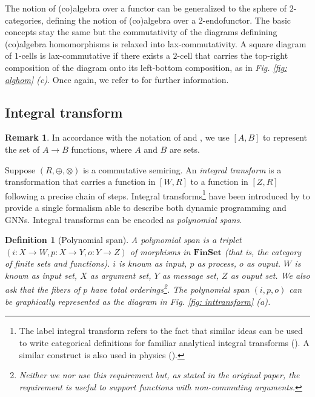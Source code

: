 \documentclass[11pt,a4paper,openright,twoside]{report}
\newcounter{mycounter}
\theoremstyle{plain}
\newtheorem{definition}[mycounter]{Definition}
\theoremstyle{definition}
\newtheorem{remark}[mycounter]{Remark}
\begin{document}
The notion of (co)algebra over a functor can be generalized to the sphere of $2$-categories, defining the notion of (co)algebra over a $2$-endofunctor. The basic concepts stay the same but the commutativity of the diagrams definining (co)algebra homomorphisms is relaxed into lax-commutativity. A square diagram of $1$-cells is lax-commutative if there exists a $2$-cell that carries the top-right composition of the diagram onto its left-bottom composition, as in \textit{Fig. \ref{fig: alghom} (c)}. Once again, we refer to \cite{gavranovicposition} for further information.

\subsection{Integral transform}

\begin{remark}
  In accordance with the notation of \cite{dudzik2022graph} and \cite{dudzik2024asynchronous}, we use $[A,B]$ to represent the set of $A \to B$ functions, where $A$ and $B$ are sets.
\end{remark}

Suppose $(R, \oplus, \otimes)$ is a commutative semiring. An \textit{integral transform} is a transformation that carries a function in $[W,R]$ to a function in $[Z,R]$ following a precise chain of steps. Integral transforms\footnote{The label integral transform refers to the fact that similar ideas can be used to write categorical definitions for familiar analytical integral transforms (\cite{golem_ph_utexas_edu}). A similar construct is also used in physics (\cite{eastwood1980cohomology}).} have been introduced by \cite{dudzik2022graph} to provide a single formalism able to describe both dynamic programming and GNNs. Integral transforms can be encoded as \textit{polynomial spans}.

\begin{definition}[Polynomial span]
  A polynomial span is a triplet $(i: X \to W,p: X \to Y,o: Y \to Z)$ of morphisms in $\mathbf{FinSet}$ (that is, the category of finite sets and functions). $i$ is known as input, $p$ as process, $o$ as ouput. $W$ is known as input set, $X$ as argument set, $Y$ as message set, $Z$ as ouput set. We also ask that the fibers of $p$ have total orderings\footnote{Neither we nor \cite{dudzik2022graph} use this requirement but, as stated in the original paper, the requirement is useful to support functions with non-commuting arguments.}. The polynomial span $(i,p,o)$ can be graphically represented as the diagram in \textit{Fig. \ref{fig: inttransform} (a)}.
\end{definition}
\end{document}
